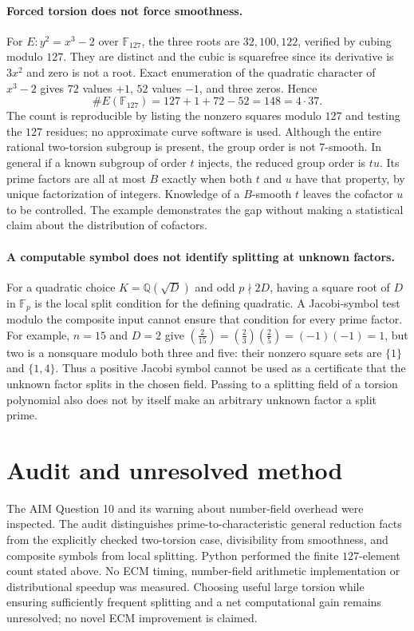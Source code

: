 \documentclass[11pt]{article}
\begin{document}
\paragraph{Forced torsion does not force smoothness.}
For $E:y^2=x^3-2$ over $\mathbb F_{127}$, the three roots are
$32,100,122$, verified by cubing modulo $127$. They are distinct and
the cubic is squarefree since its derivative is $3x^2$ and zero is
not a root. Exact enumeration of the quadratic character of $x^3-2$
gives $72$ values $+1$, $52$ values $-1$, and three zeros. Hence
\[
\#E(\mathbb F_{127})=127+1+72-52=148=4\cdot37.
\]
The count is reproducible by listing the nonzero squares modulo $127$
and testing the $127$ residues; no approximate curve software is used.
Although the entire rational two-torsion subgroup is present, the group
order is not $7$-smooth. In general if a known subgroup of order $t$
injects, the reduced group order is $t u$. Its prime factors are all
at most $B$ exactly when both $t$ and $u$ have that property, by unique
factorization of integers. Knowledge of a $B$-smooth $t$ leaves the
cofactor $u$ to be controlled. The example demonstrates the gap without
making a statistical claim about the distribution of cofactors.

\paragraph{A computable symbol does not identify splitting at unknown factors.}
For a quadratic choice $K=\mathbb Q(\sqrt D)$ and odd
$p\nmid2D$, having a square root of $D$ in $\mathbb F_p$ is the
local split condition for the defining quadratic. A Jacobi-symbol test
modulo the composite input cannot ensure that condition for every prime
factor. For example, $n=15$ and $D=2$ give
$\left(\frac2{15}\right)=
\left(\frac23\right)\left(\frac25\right)=(-1)(-1)=1$,
but two is a nonsquare modulo both three and five: their nonzero square
sets are $\{1\}$ and $\{1,4\}$. Thus a positive Jacobi symbol cannot
be used as a certificate that the unknown factor splits in the chosen
field. Passing to a splitting field of a torsion polynomial also does
not by itself make an arbitrary unknown factor a split prime.

\section{Audit and unresolved method}
The AIM Question 10 and its warning about number-field overhead were
inspected. The audit distinguishes prime-to-characteristic general
reduction facts from the explicitly checked two-torsion case, divisibility
from smoothness, and composite symbols from local splitting. Python
performed the finite $127$-element count stated above. No ECM timing,
number-field arithmetic implementation or distributional speedup was
measured. Choosing useful large torsion while ensuring sufficiently
frequent splitting and a net computational gain remains unresolved;
no novel ECM improvement is claimed.
\end{document}
